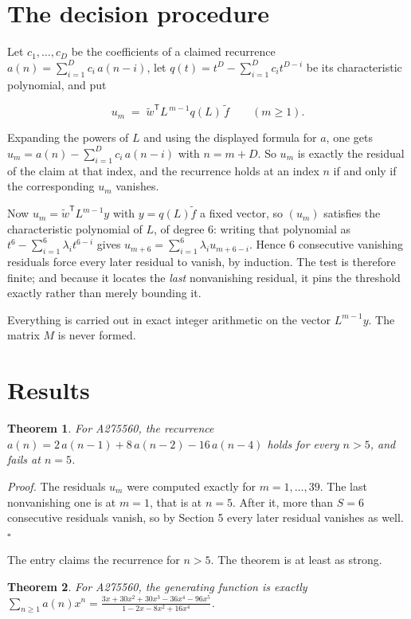 \documentclass[11pt]{article}
\newtheorem{theorem}{Theorem}
\theoremstyle{definition}
\begin{document}
\section{The decision procedure}

Let $c_1,\dots,c_D$ be the coefficients of a claimed recurrence $a(n) = \sum_{i=1}^{D} c_i\,a(n-i)$, let $q(t) = t^{D} - \sum_{i=1}^{D} c_i t^{D-i}$ be its characteristic polynomial, and put

\[u_m \;=\; \tilde w^{\mathsf T} L^{\,m-1} q(L)\,\tilde f \qquad (m \ge 1).\]

Expanding the powers of $L$ and using the displayed formula for $a$, one gets $u_m = a(n) - \sum_{i=1}^{D} c_i\,a(n-i)$ with $n = m + D$. So $u_m$ is exactly the residual of the claim at that index, and the recurrence holds at an index $n$ if and only if the corresponding $u_m$ vanishes.

Now $u_m = \tilde w^{\mathsf T} L^{m-1} y$ with $y = q(L)\tilde f$ a fixed vector, so $(u_m)$ satisfies the characteristic polynomial of $L$, of degree $6$: writing that polynomial as $t^{6} - \sum_{i=1}^{6} \lambda_i t^{6-i}$ gives $u_{m+6} = \sum_{i=1}^{6} \lambda_i u_{m+6-i}$. Hence $6$ consecutive vanishing residuals force every later residual to vanish, by induction. The test is therefore finite; and because it locates the {\itshape last} nonvanishing residual, it pins the threshold exactly rather than merely bounding it.

Everything is carried out in exact integer arithmetic on the vector $L^{m-1}y$. The matrix $M$ is never formed.

\section{Results}

\begin{theorem} For A275560, the recurrence $a(n) = 2\,a(n-1) + 8\,a(n-2) - 16\,a(n-4)$ holds for every $n > 5$, and fails at $n = 5$.\end{theorem}

{\itshape Proof.} The residuals $u_m$ were computed exactly for $m = 1,\dots,39$. The last nonvanishing one is at $m = 1$, that is at $n = 5$. After it, more than $S = 6$ consecutive residuals vanish, so by Section 5 every later residual vanishes as well. $\square$

The entry claims the recurrence for $n > 5$. The theorem is at least as strong.

\begin{theorem} For A275560, the generating function is exactly $\sum_{n\ge 1} a(n)x^n = \frac{3x + 30x^{2} + 30x^{3} - 36x^{4} - 96x^{5}}{1 - 2x - 8x^{2} + 16x^{4}}$.\end{theorem}
\end{document}
